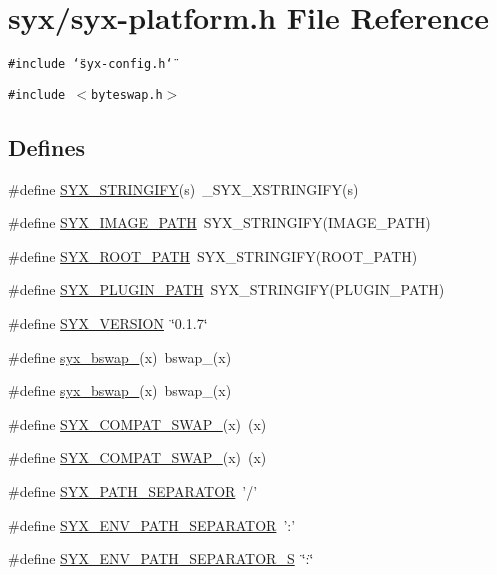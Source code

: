 \hypertarget{syx-platform_8h}{
\section{syx/syx-platform.h File Reference}
\label{syx-platform_8h}
}
{\tt \#include \char`\"{}syx-config.h\char`\"{}}\par
{\tt \#include $<$byteswap.h$>$}\par
\subsection*{Defines}
\begin{CompactItemize}
\item 
\#define \hyperlink{syx-platform_8h_622806f9d7c362423c019eec056166aa}{SYX\_\-STRINGIFY}(s)~\_\-SYX\_\-XSTRINGIFY(s)
\item 
\#define \hyperlink{syx-platform_8h_96e7668db9abdb2c425fd399ddb6981f}{SYX\_\-IMAGE\_\-PATH}~SYX\_\-STRINGIFY(IMAGE\_\-PATH)
\item 
\#define \hyperlink{syx-platform_8h_84328b74550048d04344e1663dcef3fd}{SYX\_\-ROOT\_\-PATH}~SYX\_\-STRINGIFY(ROOT\_\-PATH)
\item 
\#define \hyperlink{syx-platform_8h_69737baf997340c597dd4475c04ffd3d}{SYX\_\-PLUGIN\_\-PATH}~SYX\_\-STRINGIFY(PLUGIN\_\-PATH)
\item 
\#define \hyperlink{syx-platform_8h_c2b54093b7f1983c5d29a360f2714a6a}{SYX\_\-VERSION}~\char`\"{}0.1.7\char`\"{}
\item 
\#define \hyperlink{syx-platform_8h_b32818fbe1b8ab4d2bca08f52cb6deae}{syx\_\-bswap\_}(x)~bswap\_(x)
\item 
\#define \hyperlink{syx-platform_8h_0032b7dbe9fd3f3ad2deee119f517180}{syx\_\-bswap\_}(x)~bswap\_(x)
\item 
\#define \hyperlink{syx-platform_8h_7243fce3949aef0f36062013ef55d850}{SYX\_\-COMPAT\_\-SWAP\_}(x)~(x)
\item 
\#define \hyperlink{syx-platform_8h_71465e87bba943fefbd104237bd051ee}{SYX\_\-COMPAT\_\-SWAP\_}(x)~(x)
\item 
\#define \hyperlink{syx-platform_8h_402f4162e0a9614b60e6656f210340a2}{SYX\_\-PATH\_\-SEPARATOR}~'/'
\item 
\#define \hyperlink{syx-platform_8h_85733c8e1279536d1bbdb01e5e925c07}{SYX\_\-ENV\_\-PATH\_\-SEPARATOR}~':'
\item 
\#define \hyperlink{syx-platform_8h_8b36222964ed2c13f60f2170e3dd4bc6}{SYX\_\-ENV\_\-PATH\_\-SEPARATOR\_\-S}~\char`\"{}:\char`\"{}

\end{CompactItemize}
